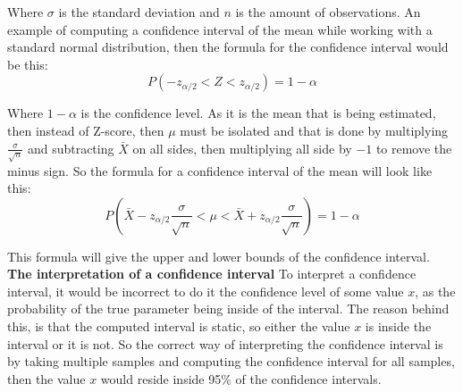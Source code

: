\noindent Where $\sigma$ is the standard deviation and $n$ is the amount of observations. An example of computing a confidence interval of the mean while working with a standard normal distribution, then the formula for the confidence interval would be this:
\begin{equation}
P(-z_{\alpha/2}<Z<z_{\alpha/2}) = 1-\alpha
\end{equation}

\noindent Where $1-\alpha$ is the confidence level. As it is the mean that is being estimated, then instead of Z-score, then $\mu$ must be isolated and that is done by multiplying $\frac{\sigma}{\sqrt{n}}$ and subtracting $\bar{X}$ on all sides, then multiplying all side by $-1$ to remove the minus sign. So the formula for a confidence interval of the mean will look like this:
\begin{equation}
P(\bar{X}-z_{\alpha/2}\frac{\sigma}{\sqrt{n}}<\mu<\bar{X}+z_{\alpha/2}\frac{\sigma}{\sqrt{n}})=1-\alpha
\end{equation}

\noindent This formula will give the upper and lower bounds of the confidence interval.\\

\noindent \textbf{The interpretation of a confidence interval}
\newline
To interpret a confidence interval, it would be incorrect to do it the confidence level of some value $x$, as the probability of the true parameter being inside of the interval. The reason behind this, is that the computed interval is static, so either the value $x$ is inside the interval or it is not. So the correct way of interpreting the confidence interval is by taking multiple samples and computing the confidence interval for all samples, then the value $x$ would reside inside 95\% of the confidence intervals.\cite{ProbAndStat_8th}



